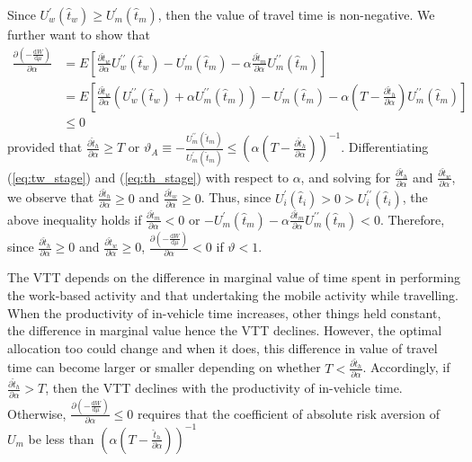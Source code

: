 \documentclass[12pt,a4paper,british]{article}
\makeatletter
\newenvironment{proof}[1][\proofname]{\par
    \normalfont\topsep6\p@\@plus6\p@\relax
    \trivlist
    \itemindent\parindent
    \item[\hskip\labelsep
          \scshape
      #1]\ignorespaces
  }{%
    \endtrivlist\@endpefalse
  }
\providecommand{\proofname}{Proof}
\makeatother
\begin{document}
\begin{proof}
Since $U_{w}^{\prime}\left(\hat{t}_{w}\right) \geq U_{m}^{\prime} \left( \hat{t}_{m} \right)$, then the value of travel time is non-negative. We further want to show that 
\begin{align*}
\frac{\partial\left(-\frac{\mathrm{d}W}{\mathrm{d}\mu}\right)}{\partial\alpha} & = E\left[ \frac{\partial\hat{t}_{w}}{\partial\alpha} U_{w}^{\prime\prime}\left( \hat{t}_{w}\right) - U_{m}^{\prime}\left(\hat{t}_{m}\right)  -\alpha \frac{\partial \hat{t}_{m} }{\partial \alpha} U_{m}^{\prime\prime}\left(\hat{t}_{m}\right) \right] \\
& = E\left[\frac{\partial\hat{t}_{w}}{\partial\alpha} \left( U_{w}^{\prime\prime}\left( \hat{t}_{w}\right) + \alpha U_{m}^{\prime\prime}\left( \hat{t}_{m}\right) \right) - U_{m}^{\prime}\left(\hat{t}_{m}\right)  -\alpha  \left(T - \frac{\partial \hat{t}_{h} }{\partial \alpha} \right) U_{m}^{\prime\prime}\left(\hat{t}_{m}\right) \right] \\
& \leq 0
\end{align*}
provided that $\frac{\partial \hat{t}_h}{\partial \alpha} \geq T$ or $\vartheta_A \equiv -\frac{U_{m}^{\prime\prime}\left(\hat{t}_{m}\right)}{U_{m}^{\prime} \left(\hat{t}_{m}\right)} \leq \left(\alpha \left(T-\frac{\partial \hat{t}_h}{\partial \alpha}\right)\right)^{-1}$. Differentiating (\ref{eq:tw_stage}) and (\ref{eq:th_stage}) with respect to $\alpha$, and solving for $\frac{\partial\hat{t}_{h}} {\partial\alpha}$ and $\frac{\partial\hat{t}_{w}} {\partial\alpha}$, we observe that $\frac{\partial\hat{t}_{h}}{\partial\alpha} \geq 0$ and $\frac{\partial\hat{t}_{w}}{\partial\alpha}\geq0$. Thus, since $U_{i}^{\prime}\left(\hat{t}_{i}\right) > 0 > U_{i}^{\prime\prime}\left(\hat{t}_{i}\right)$, the above inequality holds if $\frac{\partial\hat{t}_{m}}{\partial\alpha} < 0$ or $-U_{m}^{\prime}\left(\hat{t}_{m}\right) - \alpha \frac{\partial\hat{t}_{m}} {\partial\alpha} U_{m}^{\prime\prime}\left( \hat{t}_{m} \right) < 0$. Therefore, since $\frac{\partial\hat{t}_{h}} {\partial\alpha} \geq 0$ and $\frac{\partial\hat{t}_{w}} {\partial\alpha} \geq 0$, $\frac{\partial\left( - \frac{\mathrm{d}W}{\mathrm{d}\mu} \right)} {\partial\alpha} < 0$  if $\vartheta<1$.
\end{proof}


The VTT depends on the difference in marginal value of time spent in performing the work-based activity and that undertaking the mobile activity while travelling. When the productivity of in-vehicle time increases, other things held constant, the difference in marginal value hence the VTT declines. However, the optimal allocation too could change and when it does, this difference in value of travel time can become larger or smaller depending on whether $T < \frac{\partial \hat{t}_h}{\partial \alpha}$. Accordingly, if $\frac{\partial \hat{t}_h}{\partial \alpha} > T$, then the VTT declines with the productivity of in-vehicle time. Otherwise, $\frac{\partial\left( -\frac{\mathrm{d}W }{\mathrm{d}\mu} \right)}{\partial\alpha} \leq 0$ requires that the coefficient of absolute risk aversion of $U_m$ be less than $\left( \alpha \left(T - \frac{\hat{t}_h}{\partial \alpha} \right) \right)^{-1}$
\end{document}
